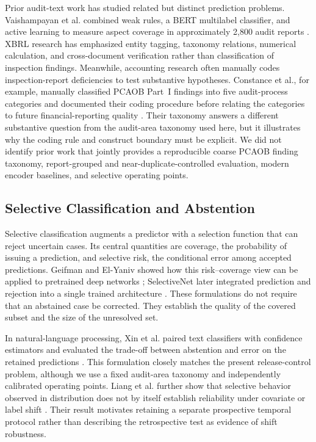\documentclass[11pt]{article}
\begin{document}
Prior audit-text work has studied related but distinct prediction problems.
Vaishampayan et al. combined weak rules, a BERT multilabel classifier, and active
learning to measure aspect coverage in approximately 2,800 audit reports
\cite{vaishampayan2023audit}. XBRL research has emphasized entity
tagging, taxonomy relations, numerical calculation, and cross-document
verification rather than classification of inspection findings. Meanwhile,
accounting research often manually codes inspection-report deficiencies to test
substantive hypotheses. Constance et al., for example, manually classified PCAOB
Part~I findings into five audit-process categories and documented their coding
procedure before relating the categories to future financial-reporting quality
\cite{constance2025pcaob}. Their taxonomy answers a different substantive
question from the audit-area taxonomy used here, but it illustrates why the
coding rule and construct boundary must be explicit.
We did not identify prior work that jointly provides a reproducible coarse PCAOB
finding taxonomy, report-grouped and near-duplicate-controlled evaluation, modern
encoder baselines, and selective operating points.

\subsection{Selective Classification and Abstention}

Selective classification augments a predictor with a selection function that can
reject uncertain cases. Its central quantities are coverage, the probability of
issuing a prediction, and selective risk, the conditional error among accepted
predictions. Geifman and El-Yaniv showed how this risk--coverage view can be
applied to pretrained deep networks \cite{geifman2017selective}; SelectiveNet
later integrated prediction and rejection into a single trained architecture
\cite{geifman2019selectivenet}. These formulations do not require that an
abstained case be corrected. They establish the quality of the covered subset and
the size of the unresolved set.

In natural-language processing, Xin et al. paired text classifiers with
confidence estimators and evaluated the trade-off between abstention and error on
the retained predictions \cite{xin2021abstention}. This formulation closely
matches the present release-control problem, although we use a fixed audit-area
taxonomy and independently calibrated operating points. Liang et al. further show
that selective behavior observed in distribution does not by itself establish
reliability under covariate or label shift \cite{liang2024shift}. Their result
motivates retaining a separate prospective temporal protocol rather than
describing the retrospective test as evidence of shift robustness.
\end{document}
